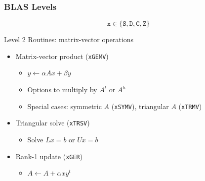 \documentclass[xcolor={x11names,svgnames},x11names,svgnames]{beamer}
\newcommand{\red}{\alert}
\begin{document}

\begin{frame}
  \frametitle{BLAS Levels}

  \[
    \texttt{x} \in \{ \texttt{S}, \texttt{D}, \texttt{C}, \texttt{Z} \}
  \]
  
  \begin{block}{Level 2 Routines: \red{matrix-vector} operations}
    \begin{itemize}
    \item Matrix-vector product (\texttt{xGEMV}) 
      \begin{itemize}
      \item $y \gets \alpha Ax + \beta y$
      \item Options to multiply by $A^t$ or $A^h$
      \item Special cases: symmetric $A$ (\texttt{xSYMV}), triangular $A$ (\texttt{xTRMV})
      \end{itemize}

      \medskip
      
    \item Triangular solve (\texttt{xTRSV})
      \begin{itemize}
      \item Solve $Lx = b$ or $Ux = b$
      \end{itemize}

      \medskip
      
    \item Rank-1 update (\texttt{xGER})
      \begin{itemize}
      \item $A \gets A + \alpha x y^t$        
      \end{itemize}
    \end{itemize}
  \end{block}
\end{frame}

\end{document}
